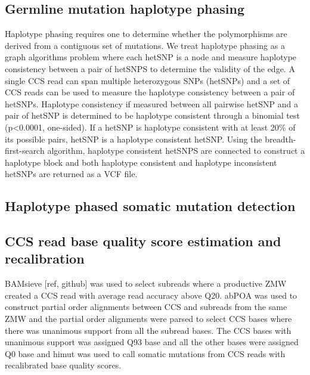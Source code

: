 \subsection{Germline mutation haplotype phasing}

Haplotype phasing requires one to determine whether the polymorphisms are derived from a contiguous set of mutations. We treat haplotype phasing as a graph algorithms problem where each hetSNP is a node and measure haplotype consistency between a pair of hetSNPS to determine the validity of the edge. A single CCS read can span multiple heterozygous SNPs (hetSNPs) and a set of CCS reads can be used to measure the haplotype consistency between a pair of hetSNPs. Haplotype consistency if measured between all pairwise hetSNP and a pair of hetSNP is determined to be haplotype consistent through a binomial test (p<0.0001, one-sided). If a hetSNP is haplotype consistent with at least 20\% of its possible pairs, hetSNP is a haplotype consistent hetSNP. Using the breadth-first-search algorithm, haplotype consistent hetSNPS are connected to construct a haplotype block and both haplotype consistent and haplotype inconsistent hetSNPs are returned as a VCF file. 

\subsection{Haplotype phased somatic mutation detection}


\subsection{CCS read base quality score estimation and recalibration}

BAMsieve [ref, github] was used to select subreads where a productive ZMW created a CCS read with average read accuracy above Q20. abPOA was used to construct partial order alignments between CCS and subreads from the same ZMW and the partial order alignments were parsed to select CCS bases where there was unanimous support from all the subread bases. The CCS bases with unanimous support was assigned Q93 base and all the other bases were assigned Q0 base and himut was used to call somatic mutations from CCS reads with recalibrated base quality scores. 

